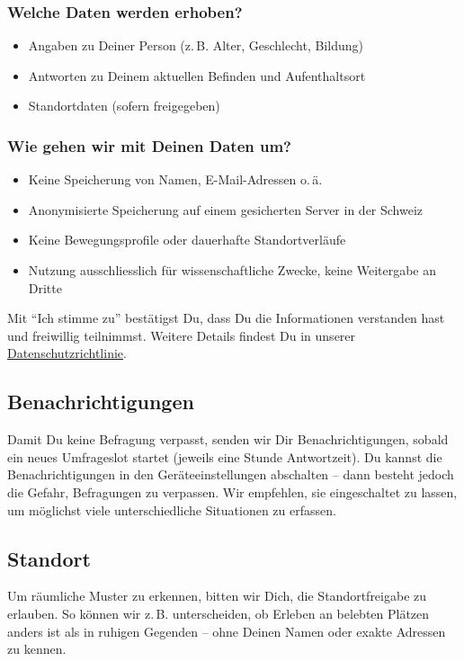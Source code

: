 \begin{appendices}
\subsubsection*{Welche Daten werden erhoben?}
\begin{itemize}\setlength{\itemsep}{0pt}
  \item Angaben zu Deiner Person (z.\,B. Alter, Geschlecht, Bildung)
  \item Antworten zu Deinem aktuellen Befinden und Aufenthaltsort
  \item Standortdaten (sofern freigegeben)
\end{itemize}

\subsubsection*{Wie gehen wir mit Deinen Daten um?}
\begin{itemize}\setlength{\itemsep}{0pt}
  \item Keine Speicherung von Namen, E-Mail-Adressen o.\,ä.
  \item Anonymisierte Speicherung auf einem gesicherten Server in der Schweiz
  \item Keine Bewegungsprofile oder dauerhafte Standortverläufe
  \item Nutzung ausschliesslich für wissenschaftliche Zwecke, keine Weitergabe an Dritte
\end{itemize}

Mit \enquote{Ich stimme zu} bestätigst Du, dass Du die Informationen verstanden hast und freiwillig teilnimmst. Weitere Details findest Du in unserer \href{https://intermind.ch/privacy-policy.html}{Datenschutzrichtlinie}.

\hrulefill

\subsection*{Benachrichtigungen}
Damit Du keine Befragung verpasst, senden wir Dir Benachrichtigungen, sobald ein neues Umfrageslot startet (jeweils eine Stunde Antwortzeit).  
Du kannst die Benachrichtigungen in den Geräteeinstellungen abschalten – dann besteht jedoch die Gefahr, Befragungen zu verpassen.  
Wir empfehlen, sie eingeschaltet zu lassen, um möglichst viele unterschiedliche Situationen zu erfassen.

\hrulefill

\subsection*{Standort}
Um räumliche Muster zu erkennen, bitten wir Dich, die Standortfreigabe zu erlauben. So können wir z.\,B. unterscheiden, ob Erleben an belebten Plätzen anders ist als in ruhigen Gegenden – ohne Deinen Namen oder exakte Adressen zu kennen.


\end{appendices}
